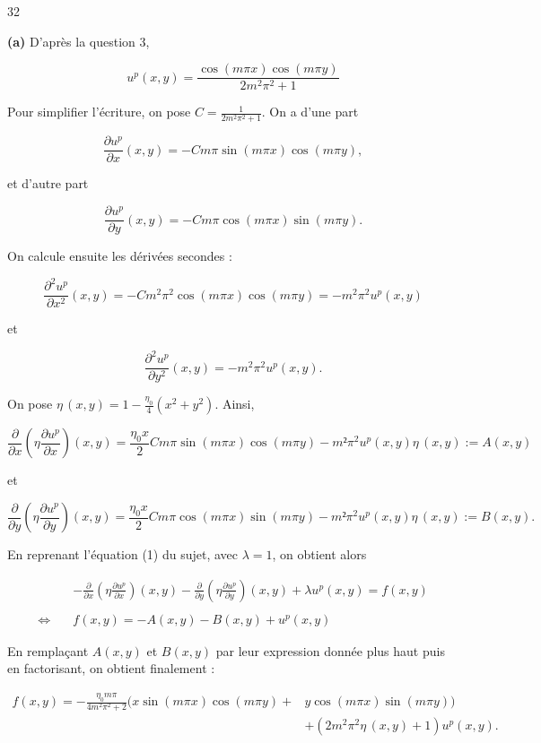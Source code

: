 \begin{reponse}{32}

\textbf{(a)} D'après la question 3,

\[
    u^p(x,y) = \frac{\cos (m \pi x) \cos (m \pi y)}{2m^2\pi^2 +1}
\]

Pour simplifier l'écriture, on pose $C=\frac{1}{2m^2\pi^2 +1}$. On a d'une part

\[
    \frac{\partial u^p}{\partial x}(x,y) = -Cm\pi\sin(m \pi x)\cos(m\pi y),
\]

et d'autre part

\[
    \frac{\partial u^p}{\partial y}(x,y) = -Cm\pi\cos(m \pi x)\sin(m\pi y).
\]

On calcule ensuite les dérivées secondes :

\[
    \frac{\partial ^2u^p}{\partial x^2}(x,y) = -Cm^2\pi^2\cos (m\pi x)\cos(m\pi y) = -m^2\pi^2 u^p(x,y)
\]

et

\[
    \frac{\partial ^2u^p}{\partial y^2}(x,y) =-m^2\pi^2 u^p(x,y).
\]

On pose $\eta \, (x,y) = 1- \frac{\eta_0}{4}(x^2+y^2)$. Ainsi,

\[
    \frac{\partial}{\partial x}\left(\eta \frac{\partial u^p}{\partial x}\right)(x,y) = \frac{\eta_0x}{2}Cm\pi \sin(m \pi x) \cos(m \pi y) - m² \pi^2 u^p(x,y)\eta \, (x,y) := A(x,y)
\]

et

\[
        \frac{\partial}{\partial y}\left(\eta \frac{\partial u^p}{\partial y}\right)(x,y) = \frac{\eta_0x}{2}Cm\pi \cos(m \pi x) \sin(m \pi y) - m² \pi^2 u^p(x,y)\eta \, (x,y) := B(x,y).
\]

En reprenant l'équation (1) du sujet, avec $\lambda = 1$, on obtient alors

\begin{align*}
   & -\frac{\partial}{\partial x} \left( \eta \frac{\partial u^p}{\partial x}\right)(x,y) -\frac{\partial}{\partial y} \left( \eta \frac{\partial u^p}{\partial y}\right)(x,y) + \lambda u^p(x,y) = f(x,y) \\ \\
   \Longleftrightarrow \quad & f(x,y) = - A(x,y) - B(x,y) + u^p(x,y)
\end{align*}

En remplaçant $A(x,y)$ et $B(x,y)$ par leur expression donnée plus haut puis en factorisant, on obtient finalement :

\begin{align*}
    f(x,y) = -\frac{\eta_0 m \pi}{4m^2\pi^2 + 2}(x\sin(m\pi x)\cos(m\pi y)+ & y\cos(m\pi x)\sin(m\pi y)) \\
    & +(2m^2\pi^2\eta\,(x,y)+1)u^p(x,y).
\end{align*}


\end{reponse}

